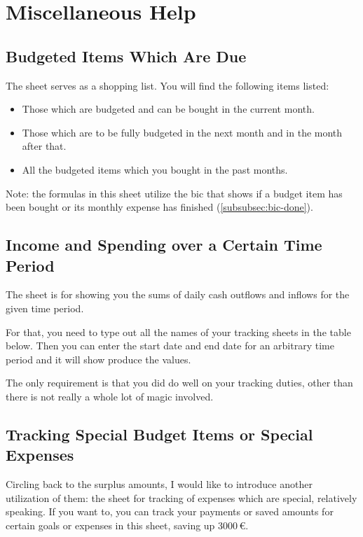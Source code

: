 \section{Miscellaneous Help}
\label{sec:miscellaneous-help}

\subsection{Budgeted Items Which Are Due}
\label{subsec:budgeted-items-which-are-due}

The sheet  serves as a shopping list.
You will find the following items listed:
\begin{itemize}
	\item Those which are budgeted and can be bought in the current month.
	\item Those which are to be fully budgeted in the next month and in the month after that.
	\item All the budgeted items which you bought in the past months.
\end{itemize}

Note: the formulas in this sheet utilize the \ac{bic} that shows if a budget item has been bought or its monthly expense has finished (\autoref{subsubsec:bic-done}).

\subsection{Income and Spending over a Certain Time Period}
\label{subsec:income-and-spending-certain-time-period}

The sheet  is for showing you the sums of daily cash outflows and inflows for the given time period.

For that, you need to type out all the names of your tracking sheets in the table below.
Then you can enter the start date and end date for an arbitrary time period and it will show produce the values.

The only requirement is that you did do well on your tracking duties, other than there is not really a whole lot of magic involved.

\subsection{Tracking Special Budget Items or Special Expenses}
\label{subsec:tracking-special-expenses}

Circling back to the surplus amounts, I would like to introduce another utilization of them: the sheet for tracking of expenses which are special, relatively speaking.
If you want to, you can track your payments or saved amounts for certain goals or expenses in this sheet, \ie saving up 3000\,€.

